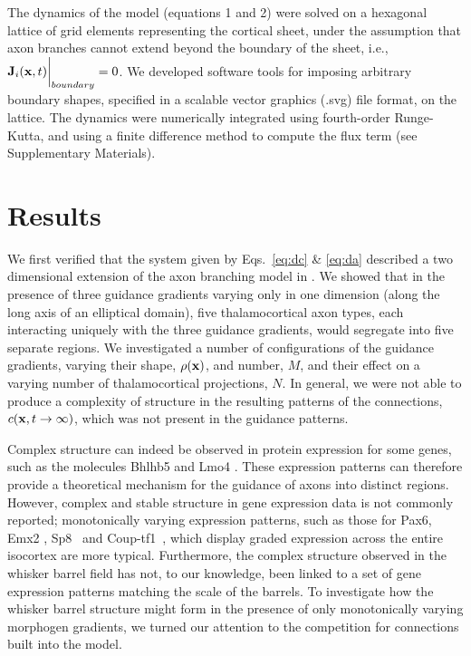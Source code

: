 \documentclass[9pt,twocolumn,twoside,lineno]{pnas-new}
\begin{document}
The dynamics of the model (equations 1 and 2) were solved on a hexagonal
lattice of grid elements representing the cortical sheet, under the assumption
that axon branches cannot extend beyond the boundary of the sheet, i.e.,
$\mathbf{J}_i(\mathbf{x},t) \bigg\rvert_{boundary} = 0$. We developed software tools
for imposing arbitrary boundary shapes, specified in a scalable vector
graphics (.svg) file format, on the lattice. The dynamics were numerically
integrated using fourth-order Runge-Kutta, and using a {\color{red} finite
  difference method} to compute the flux term (see Supplementary Materials).

\section*{Results}


We first verified that the system given by Eqs.~\ref{eq:dc} \& \ref{eq:da}
described a two dimensional extension of the axon branching model in
\citet{karbowski_model_2004}. We showed that in the presence of three guidance
gradients varying only in one dimension (along the long axis of an elliptical
domain), five thalamocortical axon types, each interacting uniquely with the
three guidance gradients, would segregate into five separate regions. We
investigated a number of configurations of the guidance gradients, varying
their shape, $\rho(\mathbf{x})$, and number, $M$, and their effect on a varying
number of thalamocortical projections, $N$. In general, we were not able to
produce a complexity of structure in the resulting patterns of the
connections, $c(\mathbf{x},t\rightarrow\infty)$, which was not present in the
guidance patterns.

Complex structure can indeed be observed in protein expression for some genes,
such as the molecules Bhlhb5 \citep{joshi_bhlhb5_2008} and Lmo4
\citep{cederquist_lmo4_2013,greig_molecular_2013}. These expression patterns
can therefore provide a theoretical mechanism for the guidance of axons into
distinct regions.
However, complex and stable structure in gene expression data is not commonly
reported; monotonically varying expression patterns, such as those for Pax6,
Emx2 \citep{shimogori_fibroblast_2005,bishop_regulation_2000},
Sp8~\citep{sahara_sp8_2007} and Coup-tf1~\citep{borello_sp8_2014}, which
display graded expression across the entire isocortex are more
typical. Furthermore, the complex structure observed in the whisker barrel
field has not, to our knowledge, been linked to a set of gene expression
patterns matching the scale of the barrels. To investigate how the whisker
barrel structure might form in the presence of only monotonically varying
morphogen gradients, we turned our attention to the competition for
connections built into the model.
\end{document}
